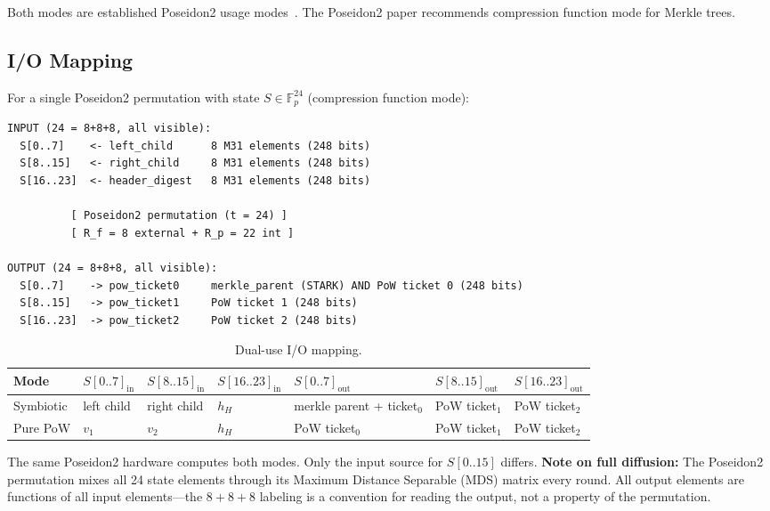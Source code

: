 \documentclass[11pt,a4paper]{article}
\begin{document}
Both modes are established Poseidon2 usage modes~\cite{poseidon2}. The Poseidon2 paper recommends compression function mode for Merkle trees.

\subsection{I/O Mapping}
\label{sec:io}

For a single Poseidon2 permutation with state $S \in \mathbb{F}_p^{24}$ (compression function mode):

\begin{Verbatim}[fontsize=\small]
INPUT (24 = 8+8+8, all visible):
  S[0..7]    <- left_child      8 M31 elements (248 bits)
  S[8..15]   <- right_child     8 M31 elements (248 bits)
  S[16..23]  <- header_digest   8 M31 elements (248 bits)

          [ Poseidon2 permutation (t = 24) ]
          [ R_f = 8 external + R_p = 22 int ]

OUTPUT (24 = 8+8+8, all visible):
  S[0..7]    -> pow_ticket0     merkle_parent (STARK) AND PoW ticket 0 (248 bits)
  S[8..15]   -> pow_ticket1     PoW ticket 1 (248 bits)
  S[16..23]  -> pow_ticket2     PoW ticket 2 (248 bits)
\end{Verbatim}

\begin{table}[h]
\centering
\small
\begin{tabular}{@{}lllllll@{}}
\toprule
Mode & $S[0..7]_{\mathrm{in}}$ & $S[8..15]_{\mathrm{in}}$ & $S[16..23]_{\mathrm{in}}$ & $S[0..7]_{\mathrm{out}}$ & $S[8..15]_{\mathrm{out}}$ & $S[16..23]_{\mathrm{out}}$ \\
\midrule
Symbiotic & left child & right child & $h_H$ & merkle parent + ticket$_0$ & PoW ticket$_1$ & PoW ticket$_2$ \\
Pure PoW & $v_1$ & $v_2$ & $h_H$ & PoW ticket$_0$ & PoW ticket$_1$ & PoW ticket$_2$ \\
\bottomrule
\end{tabular}
\caption{Dual-use I/O mapping.}
\label{tab:dual-use}
\end{table}

The same Poseidon2 hardware computes both modes. Only the input source for $S[0..15]$ differs. \textbf{Note on full diffusion:} The Poseidon2 permutation mixes all 24 state elements through its Maximum Distance Separable (MDS) matrix every round. All output elements are functions of all input elements---the $8{+}8{+}8$ labeling is a convention for reading the output, not a property of the permutation.
\end{document}
